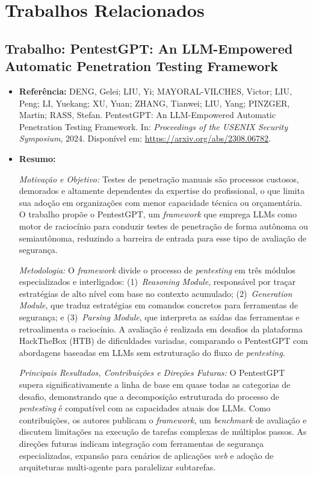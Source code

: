 \documentclass[12pt, a4paper]{article}
\begin{document}
\section{Trabalhos Relacionados}

\subsection{Trabalho: PentestGPT: An LLM-Empowered Automatic Penetration Testing Framework}

\begin{itemize}

  \item \textbf{Referência:}
  DENG, Gelei; LIU, Yi; MAYORAL-VILCHES, Victor; LIU, Peng; LI, Yuekang; XU, Yuan; ZHANG, Tianwei; LIU, Yang; PINZGER, Martin; RASS, Stefan.
  PentestGPT: An LLM-Empowered Automatic Penetration Testing Framework.
  In: \textit{Proceedings of the USENIX Security Symposium}, 2024.
  Disponível em: \url{https://arxiv.org/abs/2308.06782}.

  \item \textbf{Resumo:}

  \textit{Motivação e Objetivo:} Testes de penetração manuais são processos custosos, demorados e altamente dependentes da expertise do profissional, o que limita sua adoção em organizações com menor capacidade técnica ou orçamentária.
  O trabalho propõe o PentestGPT, um \textit{framework} que emprega LLMs como motor de raciocínio para conduzir testes de penetração de forma autônoma ou semiautônoma, reduzindo a barreira de entrada para esse tipo de avaliação de segurança.

  \textit{Metodologia:} O \textit{framework} divide o processo de \textit{pentesting} em três módulos especializados e interligados: (1)~\textit{Reasoning Module}, responsável por traçar estratégias de alto nível com base no contexto acumulado; (2)~\textit{Generation Module}, que traduz estratégias em comandos concretos para ferramentas de segurança; e (3)~\textit{Parsing Module}, que interpreta as saídas das ferramentas e retroalimenta o raciocínio.
  A avaliação é realizada em desafios da plataforma HackTheBox (HTB) de dificuldades variadas, comparando o PentestGPT com abordagens baseadas em LLMs sem estruturação do fluxo de \textit{pentesting}.

  \textit{Principais Resultados, Contribuições e Direções Futuras:} O PentestGPT supera significativamente a linha de base em quase todas as categorias de desafio, demonstrando que a decomposição estruturada do processo de \textit{pentesting} é compatível com as capacidades atuais dos LLMs.
  Como contribuições, os autores publicam o \textit{framework}, um \textit{benchmark} de avaliação e discutem limitações na execução de tarefas complexas de múltiplos passos.
  As direções futuras indicam integração com ferramentas de segurança especializadas, expansão para cenários de aplicações \textit{web} e adoção de arquiteturas multi-agente para paralelizar subtarefas.

\end{itemize}
\end{document}
